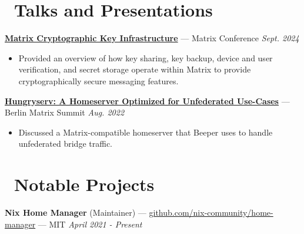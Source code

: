 \documentclass[10pt,letterpaper]{article}
\begin{document}
\section*{\faUsers\ Talks and Presentations}

{\fontsize{11}{0}\href{https://sumnerevans.com/posts/matrix/cryptographic-key-infrastructure}{%
\textbf{Matrix Cryptographic Key Infrastructure}}
--- Matrix Conference}
\hfill \textit{Sept. 2024}
\begin{itemize}
    \item Provided an overview of how key sharing, key backup, device and user
        verification, and secret storage operate within Matrix to provide
        cryptographically secure messaging features.
\end{itemize}

{\fontsize{11}{0}\href{https://github.com/sumnerevans/hungryserv-presentation}{%
\textbf{Hungryserv: A Homeserver Optimized for Unfederated Use-Cases}}
--- Berlin Matrix Summit}
\hfill \textit{Aug. 2022}
\begin{itemize}
    \item Discussed a Matrix-compatible homeserver that Beeper uses to handle
        unfederated bridge traffic.
\end{itemize}

\section*{\faCode\ Notable Projects}
{\fontsize{11}{0}
\textbf{Nix Home Manager} (Maintainer) ---
\href{https://github.com/nix-community/home-manager}{github.com/nix-community/home-manager} --- MIT}
\hfill \textit{April 2021 - Present}

\end{document}

